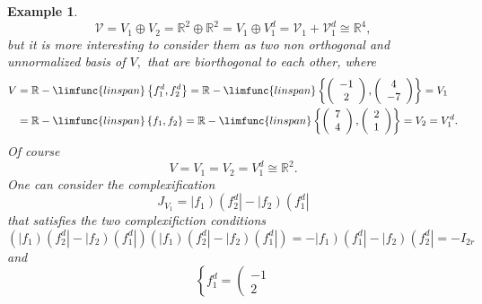 \documentclass[aps,preprint]{revtex4}
\newtheorem{example}[theorem]{Example}
\begin{document}
\begin{example}
\begin{equation}
\mathcal{V}=V_{1}\oplus V_{2}=\mathbb{R}^{2}\oplus \mathbb{R}%
^{2}=V_{1}\oplus V_{1}^{d}=\mathcal{V}_{1}+\mathcal{V}_{1}^{d}\cong \mathbb{R%
}^{4},
\end{equation}%
but it is more interesting to consider them as two non orthogonal and
unnormalized basis of $V,$ that are biorthogonal to each other, where 
\begin{align}
V& =\mathbb{R}-\limfunc{linspan}\left\{ f_{1}^{d},f_{2}^{d}\right\} =\mathbb{%
R}-\limfunc{linspan}\left\{ \left( 
\begin{array}{c}
-1 \\ 
2%
\end{array}%
\right) ,\left( 
\begin{array}{c}
4 \\ 
-7%
\end{array}%
\right) \right\} =V_{1} \\
& =\mathbb{R}-\limfunc{linspan}\left\{ f_{1},f_{2}\right\} =\mathbb{R}-%
\limfunc{linspan}\left\{ \left( 
\begin{array}{c}
7 \\ 
4%
\end{array}%
\right) ,\left( 
\begin{array}{c}
2 \\ 
1%
\end{array}%
\right) \right\} =V_{2}=V_{1}^{d}.
\end{align}%
Of course 
\begin{equation}
V=V_{1}=V_{2}=V_{1}^{d}\cong \mathbb{R}^{2}.
\end{equation}%
One can consider the complexification 
\begin{equation}
J_{V_{1}}=\left\vert f_{1}\right) \left( f_{2}^{d}\right\vert -\left\vert
f_{2}\right) \left( f_{1}^{d}\right\vert
\end{equation}%
that satisfies the two complexifiction conditions 
\begin{equation}
\left( \left\vert f_{1}\right) \left( f_{2}^{d}\right\vert -\left\vert
f_{2}\right) \left( f_{1}^{d}\right\vert \right) \left( \left\vert
f_{1}\right) \left( f_{2}^{d}\right\vert -\left\vert f_{2}\right) \left(
f_{1}^{d}\right\vert \right) =-\left\vert f_{1}\right) \left(
f_{1}^{d}\right\vert -\left\vert f_{2}\right) \left( f_{2}^{d}\right\vert
=-I_{2r}
\end{equation}%
and%
\begin{equation}
\left\{ f_{1}^{d}=\left( 
\begin{array}{c}
-1 \\ 
2%
\end{array}%

\end{equation}
\end{example}
\end{document}

